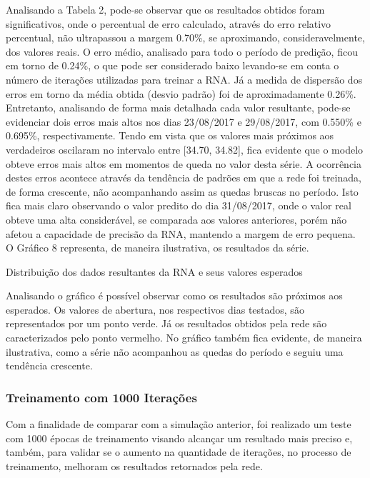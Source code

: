 Analisando a Tabela 2, pode-se observar que os resultados obtidos foram significativos, onde o percentual de erro calculado, através do erro relativo percentual, não ultrapassou a margem 0.70\%, se aproximando, consideravelmente, dos valores reais. O erro médio, analisado para todo o período de predição, ficou em torno de 0.24\%, o que pode ser considerado baixo levando-se em conta o número de iterações utilizadas para treinar a RNA. Já a medida de dispersão dos erros em torno da média obtida (desvio padrão) foi de aproximadamente 0.26\%. Entretanto, analisando de forma mais detalhada cada valor resultante, pode-se evidenciar dois erros mais altos nos dias 23/08/2017 e 29/08/2017, com 0.550\% e 0.695\%, respectivamente. Tendo em vista que os valores mais próximos aos verdadeiros oscilaram no intervalo entre [34.70, 34.82], fica evidente que o modelo obteve erros mais altos em momentos de queda no valor desta série. A ocorrência destes erros acontece através da tendência de padrões em que a rede foi treinada, de forma crescente, não acompanhando assim as quedas bruscas no período. Isto fica mais claro observando o valor predito do dia 31/08/2017, onde o valor real obteve uma alta considerável, se comparada aos valores anteriores, porém não afetou a capacidade de precisão da RNA, mantendo a margem de erro pequena. O Gráfico 8 representa, de maneira ilustrativa, os resultados da série.
\begin{grafico}[h]
	\centering
	\caption{Distribuição dos dados resultantes da RNA e seus valores esperados}
	\label{lingua}
\end{grafico}

Analisando o gráfico é possível observar como os resultados são próximos aos esperados. Os valores de abertura, nos respectivos dias testados, são representados por um ponto verde. Já os resultados obtidos pela rede são caracterizados pelo ponto vermelho. No gráfico também fica evidente, de maneira ilustrativa, como a série não acompanhou as quedas do período e seguiu uma tendência crescente. 

\subsubsection{Treinamento com 1000 Iterações}	
Com a finalidade de comparar com a simulação anterior, foi realizado um teste com 1000 épocas de treinamento visando alcançar um resultado mais preciso e, também, para validar se o aumento na quantidade de iterações, no processo de treinamento, melhoram os resultados retornados pela rede.

